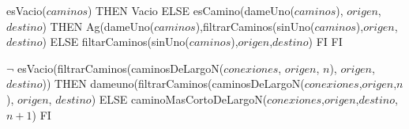 \begin{tad}{}
 {\IF esVacio($caminos$) THEN Vacio ELSE
{\IF esCamino(dameUno($caminos$), $origen$, $destino$) THEN Ag(dameUno($caminos$),filtrarCaminos(sinUno($caminos$),$origen$,$destino$) 
ELSE filtarCaminos(sinUno($caminos$),$origen$,$destino$) FI} FI}

 {\IF $\neg$ esVacio(filtrarCaminos(caminosDeLargoN($conexiones$, $origen$, $n$), $origen$, $destino$)) 
THEN dameuno(filtrarCaminos(caminosDeLargoN($conexiones$,$origen$,$n$), $origen$, $destino$) ELSE caminoMasCortoDeLargoN($conexiones$,$origen$,$destino$,$n+1$) FI}


\end{tad}

